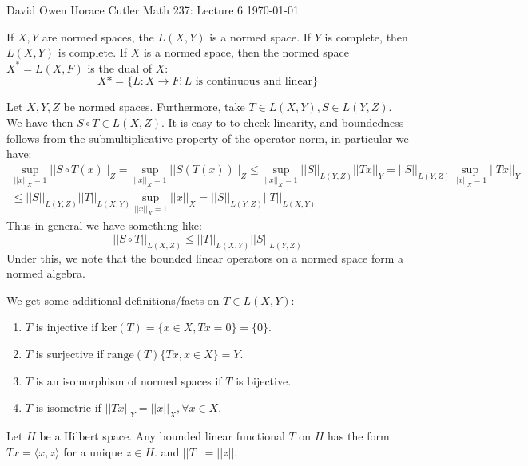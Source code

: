 \documentclass[12pt]{article}
\newenvironment{theorem}[2][Theorem]{\begin{trivlist}
\item[\hskip \labelsep {\bfseries #1}\hskip \labelsep {\bfseries #2.}]}{\end{trivlist}}
\newenvironment{example}[1][Example]{\begin{trivlist}
\item[\hskip \labelsep {\bfseries #1:}]}{\end{trivlist}}
\begin{document}
\noindent David Owen Horace Cutler \hfill {\Large Math 237: Lecture 6} \hfill \today

\begin{example}
    If $X, Y$ are normed spaces, the $L(X,Y)$ is a normed space. If $Y$ is complete, then $L(X,Y)$ is complete. If $X$ is a normed space, then the normed space $X^* = L(X, F)$ is the dual of $X$:
    $$X* = \{L : X \rightarrow F : L \text{ is continuous and linear}\}$$
\end{example}

\begin{example}
    Let $X, Y, Z$ be normed spaces. Furthermore, take $T \in L(X,Y), S \in L(Y,Z)$. We have then $S \circ T \in L(X,Z)$. It is easy to to check linearity, and boundedness follows from the submultiplicative property of the operator norm, in particular we have:
    \begin{equation}
        \begin{aligned}
        \underset{||x||_X = 1}{\sup} ||S \circ T(x)||_Z = \underset{||x||_X = 1}{\sup} ||S(T(x))||_Z \leq \underset{||x||_X = 1}{\sup} ||S||_{L(Y,Z)}||Tx||_Y = ||S||_{L(Y,Z)}\underset{||x||_X = 1}{\sup} ||Tx||_Y \\
        \leq ||S||_{L(Y,Z)} ||T||_{L(X,Y)} \underset{||x||_X = 1}{\sup} ||x||_X = ||S||_{L(Y,Z)} ||T||_{L(X,Y)} 
        \end{aligned}
    \end{equation}
    Thus in general we have something like:
    $$||S \circ T||_{L(X,Z)} \leq ||T||_{L(X,Y)} ||S||_{L(Y,Z)}$$
    Under this, we note that the bounded linear operators on a normed space form a normed algebra. 
\end{example}
    We get some additional definitions/facts on $T \in L(X,Y)$:
    \begin{enumerate}[label=(\alph*)]
        \item $T$ is injective if $\text{ker}(T) = \{x \in X, Tx = 0\} = \{0\}$. \\
        \item $T$ is surjective if $\text{range}(T) \{Tx, x \in X\} = Y$.
        \item $T$ is an isomorphism of normed spaces if $T$ is bijective.
        \item $T$ is isometric if $||Tx||_Y = ||x||_X, \forall x \in X$. 
    \end{enumerate}
\begin{theorem}{(Riesz Representation Theorem for Hilbert Space)}
    Let $H$ be a Hilbert space. Any bounded linear functional $T$ on $H$ has the form $Tx = \langle x, z \rangle$ for a unique $z \in H$. and $||T|| = ||z||$. 
\end{theorem}
\end{document}
